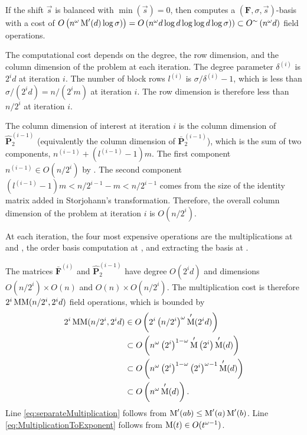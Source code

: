 \begin{thm}
\label{thm:balancedCost}If the shift $\vec{s}$ is balanced with
$\min\left(\vec{s}\right)=0$, then  computes
a $\left(\mathbf{F},\sigma,\vec{s}\right)$-basis with a cost of $O\left(n^{\omega}\M'(d)\log\sigma)\right)=O\left(n^{\omega}d\log d\log\log d\log\sigma)\right)\subset O^{\sim}\left(n^{\omega}d\right)$
field operations. \end{thm}
\begin{pf}
The computational cost depends on the degree, the row dimension, and
the column dimension of the problem at each iteration. The degree
parameter $\delta^{\left(i\right)}$ is $2^{i}d$ at iteration $i$.
The number of block rows $l^{\left(i\right)}$ is $\sigma/\delta^{\left(i\right)}-1$,
which is less than $\sigma/(2^{i}d)=n/(2^{i}m)$ at iteration $i$.
The row dimension is therefore less than $n/2^{i}$ at iteration $i$.

The column dimension of interest at iteration $i$ is the column dimension
of $\hat{\mathbf{P}}_{2}^{\left(i-1\right)}$ (equivalently the column
dimension of $\bar{\mathbf{P}}_{2}^{\left(i-1\right)}$), which is
the sum of two components, $n^{\left(i-1\right)}+(l^{\left(i-1\right)}-1)m$.
The first component $n^{\left(i-1\right)}\in O(n/2^{i})$ by .
The second component $(l^{\left(i-1\right)}-1)m<n/2^{i-1}-m<n/2^{i-1}$
comes from the size of the identity matrix added in Storjohann's transformation.
Therefore, the overall column dimension of the problem at iteration
$i$ is $O(n/2^{i})$.

At each iteration, the four most expensive operations are the multiplications
at  and ,
the order basis computation at ,
and extracting the basis at .

The matrices $\bar{\mathbf{F}}^{\left(i\right)}$ and $\hat{\mathbf{P}}_{2}^{\left(i-1\right)}$
have degree $O(2^{i}d)$ and dimensions $O(n/2^{i})\times O\left(n\right)$
and $O\left(n\right)\times O(n/2^{i})$. The multiplication cost is
therefore $2^{i}\MM(n/2^{i},2^{i}d)$ field operations, which is bounded
by\begin{align}
2^{i}\MM(n/2^{i},2^{i}d) & \in O\left(2^{i}\left(n/2^{i}\right)^{\omega}\M'(2^{i}d)\right)\label{eq:MMtoM}\\
 & \subset O\left(n^{\omega}\left(2^{i}\right)^{1-\omega}\M'\left(2^{i}\right)\M'(d)\right)\label{eq:separateMultiplication}\\
 & \subset O\left(n^{\omega}\left(2^{i}\right)^{1-\omega}\left(2^{i}\right)^{\omega-1}\M'(d)\right)\label{eq:MultiplicationToExponent}\\
 & \subset O\left(n^{\omega}\M'(d)\right).\nonumber \end{align}
 Line \ref{eq:separateMultiplication} follows from $\M'(ab)\le\M'(a)\M'(b)$.
Line \ref{eq:MultiplicationToExponent} follows from $\M(t)\in O(t^{\omega-1})$.


\end{pf}
